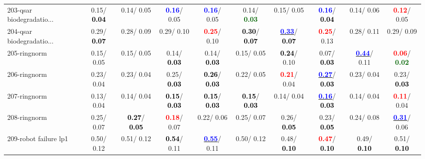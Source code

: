 \begin{table}[h]
\begin{center}
{\begin{tabular}{lc|c|c|c|c|c|c|c|c}
203-qsar biodegradatio... &   0.15/\textcolor{black}{\textbf{  0.04}} &   0.14/  0.05 & \textcolor{blue}{\textbf{  0.16}}/  0.05 & \textcolor{blue}{\textbf{  0.16}}/  0.05 &   0.14/\textcolor{darkgreen}{\textbf{  0.03}} &   0.15/  0.05 & \textcolor{blue}{\textbf{  0.16}}/\textcolor{black}{\textbf{  0.04}} &   0.14/  0.06 & \textcolor{red}{\textbf{  0.12}}/  0.05 \\
204-qsar biodegradatio... &   0.29/\textcolor{black}{\textbf{  0.07}} &   0.28/  0.09 &   0.29/  0.10 & \textcolor{red}{\textbf{  0.25}}/  0.10 & \textcolor{black}{\textbf{  0.30}}/\textcolor{black}{\textbf{  0.07}} & \underline{\textcolor{blue}{\textbf{  0.33}}}/\textcolor{black}{\textbf{  0.07}} & \textcolor{red}{\textbf{  0.25}}/  0.13 &   0.28/  0.11 &   0.29/  0.09 \\
205-ringnorm &   0.15/  0.05 &   0.15/  0.05 &   0.14/\textcolor{black}{\textbf{  0.03}} &   0.14/\textcolor{black}{\textbf{  0.03}} &   0.15/  0.05 & \textcolor{black}{\textbf{  0.24}}/  0.10 &   0.07/\textcolor{black}{\textbf{  0.03}} & \underline{\textcolor{blue}{\textbf{  0.44}}}/  0.11 & \textcolor{red}{\textbf{  0.06}}/\textcolor{darkgreen}{\textbf{  0.02}} \\
206-ringnorm &   0.23/  0.04 &   0.23/  0.04 &   0.25/\textcolor{black}{\textbf{  0.03}} & \textcolor{black}{\textbf{  0.26}}/\textcolor{black}{\textbf{  0.03}} &   0.22/  0.05 & \textcolor{red}{\textbf{  0.21}}/  0.04 & \underline{\textcolor{blue}{\textbf{  0.27}}}/\textcolor{black}{\textbf{  0.03}} &   0.23/  0.04 &   0.23/\textcolor{black}{\textbf{  0.03}} \\ \hline
207-ringnorm &   0.13/  0.04 &   0.14/  0.04 & \textcolor{black}{\textbf{  0.15}}/\textcolor{black}{\textbf{  0.03}} & \textcolor{black}{\textbf{  0.15}}/\textcolor{black}{\textbf{  0.03}} & \textcolor{black}{\textbf{  0.15}}/\textcolor{black}{\textbf{  0.03}} &   0.14/  0.04 & \underline{\textcolor{blue}{\textbf{  0.16}}}/\textcolor{black}{\textbf{  0.03}} &   0.14/  0.04 & \textcolor{red}{\textbf{  0.11}}/  0.04 \\
208-ringnorm &   0.25/  0.07 & \textcolor{black}{\textbf{  0.27}}/\textcolor{black}{\textbf{  0.05}} & \textcolor{red}{\textbf{  0.18}}/  0.07 &   0.22/  0.06 &   0.25/  0.07 &   0.26/\textcolor{black}{\textbf{  0.05}} &   0.23/\textcolor{black}{\textbf{  0.05}} &   0.24/  0.08 & \underline{\textcolor{blue}{\textbf{  0.31}}}/  0.06 \\
209-robot failure lp1 &   0.50/  0.12 &   0.51/  0.12 & \textcolor{black}{\textbf{  0.54}}/  0.11 & \underline{\textcolor{blue}{\textbf{  0.55}}}/  0.11 &   0.50/  0.12 &   0.48/\textcolor{black}{\textbf{  0.10}} & \textcolor{red}{\textbf{  0.47}}/\textcolor{black}{\textbf{  0.10}} &   0.49/\textcolor{black}{\textbf{  0.10}} &   0.51/\textcolor{black}{\textbf{  0.10}} \\

\end{tabular}}
\end{center}
\end{table}

